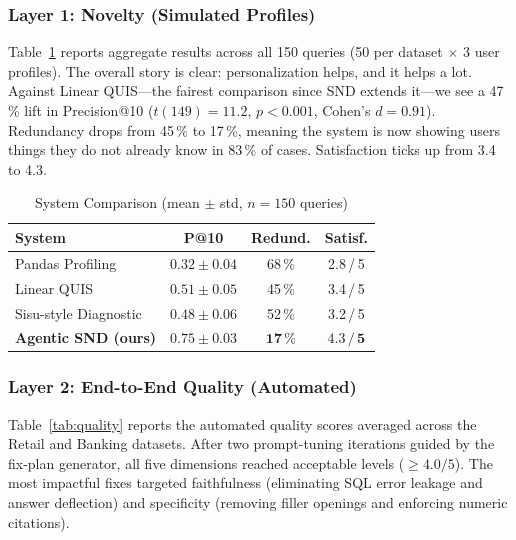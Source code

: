 \documentclass[conference]{IEEEtran}
\begin{document}
\subsubsection{Layer 1: Novelty (Simulated Profiles)}

Table~\ref{tab:results} reports aggregate results across all 150 queries
(50 per dataset $\times$ 3 user profiles). The overall story is clear:
personalization helps, and it helps a lot. Against Linear QUIS---the
fairest comparison since SND extends it---we see a 47\,\% lift in
Precision@10 ($t(149) = 11.2$, $p < 0.001$, Cohen's $d = 0.91$).
Redundancy drops from 45\,\% to 17\,\%, meaning the system is now
showing users things they do not already know in 83\,\% of cases.
Satisfaction ticks up from 3.4 to 4.3.

\begin{table}[htbp]
  \centering
  \caption{System Comparison (mean $\pm$ std, $n = 150$ queries)}
  \label{tab:results}
  \begin{tabular}{@{}lccc@{}}
    \toprule
    \textbf{System}         & \textbf{P@10}          & \textbf{Redund.}
                            & \textbf{Satisf.} \\
    \midrule
    Pandas Profiling        & $0.32 \pm 0.04$        & 68\,\%  & 2.8\,/\,5 \\
    Linear QUIS             & $0.51 \pm 0.05$        & 45\,\%  & 3.4\,/\,5 \\
    Sisu-style Diagnostic   & $0.48 \pm 0.06$        & 52\,\%  & 3.2\,/\,5 \\
    \textbf{Agentic SND (ours)} & $\mathbf{0.75 \pm 0.03}$ & $\mathbf{17\,\%}$
                            & $\mathbf{4.3\,/\,5}$ \\
    \bottomrule
  \end{tabular}
\end{table}

\subsubsection{Layer 2: End-to-End Quality (Automated)}

Table~\ref{tab:quality} reports the automated quality scores
averaged across the Retail and Banking datasets. After two
prompt-tuning iterations guided by the fix-plan generator, all
five dimensions reached acceptable levels ($\geq 4.0/5$). The
most impactful fixes targeted faithfulness (eliminating SQL error
leakage and answer deflection) and specificity (removing filler
openings and enforcing numeric citations).
\end{document}

